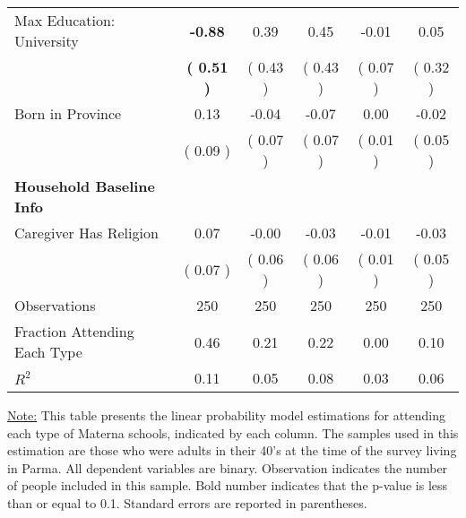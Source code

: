 \begin{table}[H]
{\begin{tabular}{lccccc}
\quad Max Education: University & \textbf{    -0.88} &      0.39 &      0.45 &     -0.01 &      0.05 \\
\quad  & \textbf{(     0.51 )} & (     0.43 )  & (     0.43 )  & (     0.07 ) & (     0.32 ) \\
\quad Born in Province &      0.13 &     -0.04 &     -0.07 &      0.00 &     -0.02 \\
\quad  & (     0.09 ) & (     0.07 )  & (     0.07 )  & (     0.01 ) & (     0.05 ) \\
\midrule
\textbf{Household Baseline Info} \\
\quad Caregiver Has Religion &      0.07 &     -0.00 &     -0.03 &     -0.01 &     -0.03 \\
\quad  & (     0.07 ) & (     0.06 )  & (     0.06 )  & (     0.01 ) & (     0.05 ) \\
\midrule
Observations & 250 & 250 & 250 & 250 & 250 \\
Fraction Attending Each Type &      0.46 &      0.21 &      0.22 &      0.00 &      0.10 \\
\midrule
$ R^2$ &      0.11 &      0.05 &      0.08 &      0.03 &      0.06 \\
\bottomrule
\end{tabular}}
\end{table}
\begin{scriptsize}
\noindent\underline{Note:} This table presents the linear probability model estimations for attending each type of Materna schools, indicated by each column. The samples used in this estimation are those who were adults in their 40's at the time of the survey living in Parma. All dependent variables are binary. Observation indicates the number of people included in this sample. Bold number indicates that the p-value is less than or equal to 0.1. Standard errors are reported in parentheses.
\end{scriptsize}
